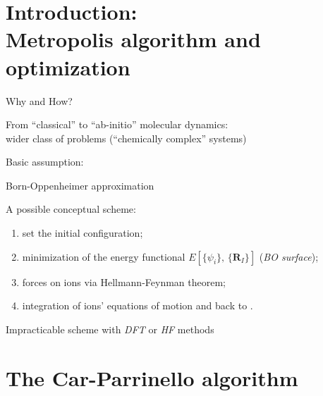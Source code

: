 	\section{Introduction:\\Metropolis algorithm and optimization}
		
\begin{frame}{Why and How?}
	\begin{center}
		From ``classical'' to ``ab-initio'' molecular dynamics:\\
		wider class of problems (``chemically complex'' systems)
	\end{center}
	Basic assumption:
	\begin{center}
		\alert{Born-Oppenheimer approximation}
	\end{center}
	A possible conceptual scheme:
	\begin{enumerate}[$i)$]
		\item set the initial configuration;
		\item minimization of the energy functional $E[\{\psi_i\},\,\{\textbf{R}_I\}]$ (\emph{BO surface});\\
		\item forces on ions via Hellmann-Feynman theorem;
		\item integration of ions' equations of motion and back to .
	\end{enumerate}
	\begin{center}
		\alert{Impracticable} scheme with \emph{DFT} or \emph{HF} methods
	\end{center}
\end{frame}


\section{The Car-Parrinello algorithm}

